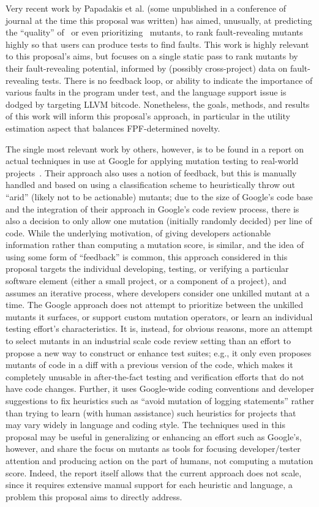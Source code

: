 Very recent work by Papadakis et al. (some unpublished in a conference
of journal at the time this proposal was written) has 
aimed, unusually, at predicting the ``quality'' of~\cite{MutQuality}
or even prioritizing~\cite{FaRM} mutants, to rank fault-revealing
mutants highly so that users can produce tests to find faults.  This
work is highly relevant to this proposal's aims, but focuses on a single static
pass to rank mutants by their fault-revealing potential, informed by
(possibly cross-project)
data on fault-revealing tests.  There is no feedback loop, or ability
to indicate the importance of various faults in the program under
test, and the language support issue is dodged by targeting LLVM
bitcode.  Nonetheless, the goals, methods, and results of this work
will inform this proposal's approach, in particular in the utility estimation
aspect that balances FPF-determined novelty.

The single most relevant work by others, however, is to be found in a
report on actual techniques in use at Google for applying mutation
testing to real-world projects~\cite{MutGoogle}.  Their approach also
uses a notion of feedback, but this is manually handled and based on
using a classification scheme to heuristically throw out ``arid''
(likely not to be actionable)
mutants; due to the size of Google's code base and the integration of
their approach in Google's code review process, there is also a
decision to only allow one mutation (initially randomly decided) per
line of code.  While the underlying motivation, of giving developers
actionable information rather than computing a mutation score, is
similar, and the idea of using some form of ``feedback'' is common,
this approach considered in this proposal targets the individual developing, testing, or verifying a particular software
element (either a small project, or a component of a project), and
assumes an iterative process, where developers consider one unkilled
mutant at a time.  The Google approach does not attempt to prioritize
between the unkilled mutants it surfaces, or support custom mutation
operators, or learn an individual testing effort's characteristics.
It is, instead, for obvious reasons, more an attempt to select mutants
in an industrial scale code review setting than an effort to propose a
new way to construct or enhance test suites; e.g., it only even
proposes mutants of code in a diff with a previous version of the
code, which makes it completely unusable in after-the-fact testing and
verification efforts that do not have code changes.  Further, it uses
Google-wide coding conventions and developer suggestions to fix
heuristics such as ``avoid mutation of logging statements'' rather
than trying to learn (with human assistance) such heuristics for
projects that may vary widely in language and coding style.  
The techniques used in this proposal may be useful in generalizing or enhancing an
effort such as Google's, however, and share the focus on mutants as
tools for focusing developer/tester attention and producing action on the
part of humans, not computing a mutation score.  Indeed, the report
itself allows that the current approach does not scale, since it
requires extensive manual support for each heuristic and language, a
problem this proposal aims to directly address.

